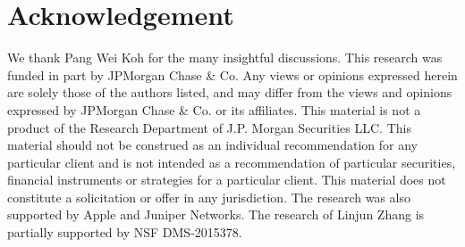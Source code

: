 \documentclass{article}
\begin{document}










\section*{Acknowledgement}
We thank Pang Wei Koh for the many insightful discussions. This research was funded in part by JPMorgan Chase \& Co. Any views or opinions expressed herein are
solely those of the authors listed, and may differ from the views and opinions expressed by JPMorgan Chase
\& Co. or its affiliates. This material is not a product of the Research Department of J.P. Morgan Securities
LLC. This material should not be construed as an individual recommendation for any particular client and is
not intended as a recommendation of particular securities, financial instruments or strategies for a particular
client. This material does not constitute a solicitation or offer in any jurisdiction. The research was also supported by Apple and Juniper Networks. The research of Linjun Zhang is partially supported by  NSF DMS-2015378.




\onecolumn


\end{document}
